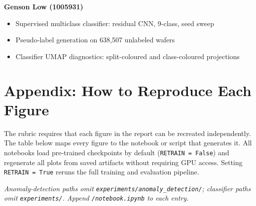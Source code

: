 \documentclass[11pt]{article}
\begin{document}
\textbf{Genson Low (1005931)}
\begin{itemize}[leftmargin=1.5em]
  \item Supervised multiclass classifier: residual CNN, 9-class, seed sweep
  \item Pseudo-label generation on 638,507 unlabeled wafers
  \item Classifier UMAP diagnostics: split-coloured and class-coloured projections
\end{itemize}

\newpage
\section{Appendix: How to Reproduce Each Figure}
\label{app:figures}

The rubric requires that each figure in the report can be recreated independently.
The table below maps every figure to the notebook or script that generates it.
All notebooks load pre-trained checkpoints by default (\texttt{RETRAIN = False})
and regenerate all plots from saved artifacts without requiring GPU access.
Setting \texttt{RETRAIN = True} reruns the full training and evaluation pipeline.

\textit{Anomaly-detection paths omit \texttt{experiments/anomaly\_detection/}; classifier paths omit \texttt{experiments/}. Append \texttt{/notebook.ipynb} to each entry.}
\end{document}
